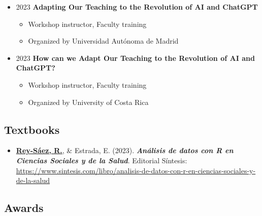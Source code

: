 \documentclass[
  letterpaper,
  DIV=11,
  numbers=noendperiod]{scrartcl}
\providecommand{\tightlist}{%
  \setlength{\itemsep}{0pt}\setlength{\parskip}{0pt}}
\begin{document}
\begin{itemize}
  \begin{itemize}
  \tightlist
  \item
    Course instructor, Undergraduate program (Bachelor's in
    Psychology)\\
  \item
    Organized by Nebrija University
  \end{itemize}
\item
  2023 \textbar{} \textbf{Adapting Our Teaching to the Revolution of AI
  and ChatGPT}

  \begin{itemize}
  \tightlist
  \item
    Workshop instructor, Faculty training\\
  \item
    Organized by Universidad Autónoma de Madrid
  \end{itemize}
\item
  2023 \textbar{} \textbf{How can we Adapt Our Teaching to the
  Revolution of AI and ChatGPT?}

  \begin{itemize}
  \tightlist
  \item
    Workshop instructor, Faculty training\\
  \item
    Organized by University of Costa Rica
  \end{itemize}
\end{itemize}

\subsection{\texorpdfstring{ Textbooks}{ Textbooks}}\label{textbooks}

\begin{itemize}
\tightlist
\item
  \ul{\textbf{Rey-Sáez, R.}}, \& Estrada, E. (2023).
  \textbf{\emph{Análisis de datos con R en Ciencias Sociales y de la
  Salud}}. Editorial Síntesis:
  \url{https://www.sintesis.com/libro/analisis-de-datos-con-r-en-ciencias-sociales-y-de-la-salud}
\end{itemize}

\subsection{\texorpdfstring{ Awards}{ Awards}}\label{awards}
\end{document}
